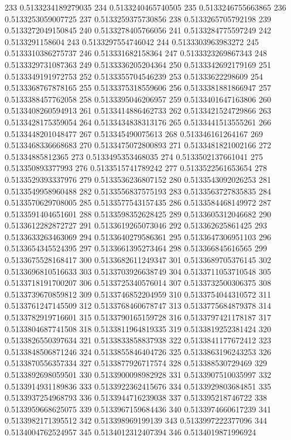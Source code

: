 233 0.5133234189279035
234 0.5133240465740505
235 0.5133246755663865
236 0.5133253059007725
237 0.5133259375730856
238 0.5133265705792198
239 0.5133272049150845
240 0.5133278405766056
241 0.5133284775597249
242 0.5133291158604
243 0.5133297554746042
244 0.5133303963983272
245 0.5133310386275737
246 0.513331682158364
247 0.5133323269867343
248 0.5133329731087363
249 0.5133336205204364
250 0.5133342692179169
251 0.5133349191972753
252 0.5133355704546239
253 0.51333622298609
254 0.5133368767878165
255 0.5133375318559606
256 0.5133381881866947
257 0.5133388457762058
258 0.5133395046206957
259 0.5133401647163806
260 0.5133408260594913
261 0.5133414886462733
262 0.5133421524729866
263 0.5133428175359054
264 0.5133434838313176
265 0.5133441513555261
266 0.5133448201048477
267 0.513345490075613
268 0.513346161264167
269 0.5133468336668683
270 0.5133475072800893
271 0.5133481821002166
272 0.51334885812365
273 0.5133495353468035
274 0.5133502137661041
275 0.513350893377993
276 0.5133515741789242
277 0.5133522561653654
278 0.5133529393337976
279 0.5133536236807152
280 0.5133543092026253
281 0.5133549958960488
282 0.5133556837575193
283 0.5133563727835835
284 0.5133570629708005
285 0.5133577543157435
286 0.5133584468149972
287 0.5133591404651601
288 0.5133598352628425
289 0.5133605312046682
290 0.5133612282872727
291 0.5133619265073046
292 0.513362625861425
293 0.5133633263463069
294 0.5133640279586361
295 0.5133647306951103
296 0.5133654345524395
297 0.5133661395273464
298 0.513366845616565
299 0.5133675528168417
300 0.5133682611249347
301 0.5133689705376145
302 0.5133696810516633
303 0.5133703926638749
304 0.5133711053710548
305 0.5133718191700207
306 0.5133725340576014
307 0.5133732500306375
308 0.5133739670859812
309 0.5133746852204959
310 0.5133754044310572
311 0.5133761247145509
312 0.5133768460678747
313 0.5133775684879378
314 0.5133782919716601
315 0.5133790165159728
316 0.5133797421178187
317 0.5133804687741508
318 0.5133811964819335
319 0.5133819252381424
320 0.5133826550397634
321 0.5133833858837938
322 0.5133841177672412
323 0.5133848506871246
324 0.5133855846404726
325 0.5133863196243253
326 0.5133870556357334
327 0.5133877926717574
328 0.513388530729469
329 0.5133892698059501
330 0.5133900098982928
331 0.5133907510035997
332 0.5133914931189836
333 0.5133922362415676
334 0.5133929803684851
335 0.5133937254968793
336 0.5133944716239038
337 0.513395218746722
338 0.5133959668625075
339 0.5133967159684436
340 0.5133974660617239
341 0.5133982171395512
342 0.513398969199139
343 0.5133997222377096
344 0.5134004762524957
345 0.5134012312407394
346 0.5134019871996924
